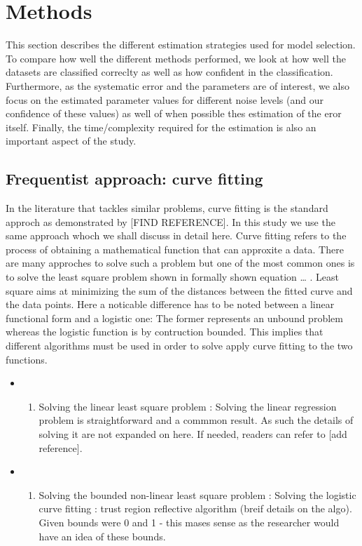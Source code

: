 \documentclass[]{article}
\providecommand{\tightlist}{%
  \setlength{\itemsep}{0pt}\setlength{\parskip}{0pt}}
\begin{document}
\hypertarget{methods}{%
\section{Methods}\label{methods}}

This section describes the different estimation strategies used for
model selection. To compare how well the different methods performed, we
look at how well the datasets are classified correclty as well as how
confident in the classification. Furthermore, as the systematic error
and the parameters are of interest, we also focus on the estimated
parameter values for different noise levels (and our confidence of these
values) as well of when possible thes estimation of the eror itself.
Finally, the time/complexity required for the estimation is also an
important aspect of the study.

\hypertarget{frequentist-approach-curve-fitting}{%
\subsection{Frequentist approach: curve
fitting}\label{frequentist-approach-curve-fitting}}

In the literature that tackles similar problems, curve fitting is the
standard approch as demonstrated by {[}FIND REFERENCE{]}. In this study
we use the same approach whoch we shall discuss in detail here. Curve
fitting refers to the process of obtaining a mathematical function that
can approxite a data. There are many approches to solve such a problem
but one of the most common ones is to solve the least square problem
shown in formally shown equation \ldots{} . Least square aims at
minimizing the sum of the distances between the fitted curve and the
data points. Here a noticable difference has to be noted between a
linear functional form and a logistic one: The former represents an
unbound problem whereas the logistic function is by contruction bounded.
This implies that different algorithms must be used in order to solve
apply curve fitting to the two functions.

\begin{itemize}
\item
  \begin{enumerate}
  \def\labelenumi{(\roman{enumi})}
  \tightlist
  \item
    Solving the linear least square problem : Solving the linear
    regression problem is straightforward and a commmon result. As such
    the details of solving it are not expanded on here. If needed,
    readers can refer to {[}add reference{]}.
  \end{enumerate}
\item
  \begin{enumerate}
  \def\labelenumi{(\roman{enumi})}
  \setcounter{enumi}{1}
  \tightlist
  \item
    Solving the bounded non-linear least square problem : Solving the
    logistic curve fitting : trust region reflective algorithm (breif
    details on the algo). Given bounds were 0 and 1 - this mases sense
    as the researcher would have an idea of these bounds.
  \end{enumerate}
\end{itemize}
\end{document}

